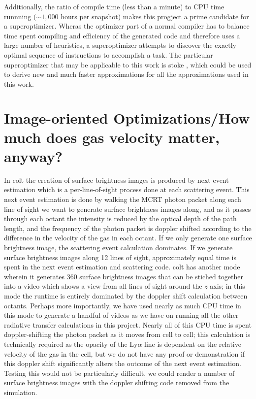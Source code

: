 Additionally, the ratio of compile time (less than a minute) to CPU time runnning ($\sim1,000$ hours per snapshot) makes this progject a prime candidate for a superoptimizer.
Wheras the optimizer part of a normal compiler has to balance time spent compiling and efficiency of the generated code and therefore uses a large number of heuristics, a superoptimizer attempts to discover the exactly optimal sequence of instructions to accomplish a task.
The particular superoptimizer that may be applicable to this work is {\sc stoke} \citep{stoke}, which could be used to derive new and much faster approximations for all the approximations used in this work.


\section{Image-oriented Optimizations/How much does gas velocity matter, anyway?}
In {\sc colt} the creation of surface brightness images is produced by next event estimation which is a per-line-of-sight process done at each scattering event.
This next event estimation is done by walking the MCRT photon packet along each line of sight we want to generate surface brightness images along, and as it passes through each octant the intensity is reduced by the optical depth of the path length, and the frequency of the photon packet is doppler shifted according to the difference in the velocity of the gas in each octant.
If we only generate one surface brightness image, the scattering event calculation dominates.
If we generate surface brightness images along 12 lines of sight, approximately equal time is spent in the next event estimation and scattering code.
{\sc colt} has another mode wherein it generates 360 surface brightness images that can be stiched together into a video which shows a view from all lines of sight around the $z$ axis; in this mode the runtime is entirely dominated by the doppler shift calculation between octants.
Perhaps more importantly, we have used nearly as much CPU time in this mode to generate a handful of videos as we have on running all the other radiative transfer calculations in this project.
Nearly all of this CPU time is spent doppler-shifting the photon packet as it moves from cell to cell; this calculation is technically required as the opacity of the Ly$\alpha$ line is dependent on the relative velocity of the gas in the cell, but we do not have any proof or demonstration if this doppler shift significantly alters the outcome of the next event estimation.
Testing this would not be particularly difficult, we could render a number of surface brightness images with the doppler shifting code removed from the simulation.

